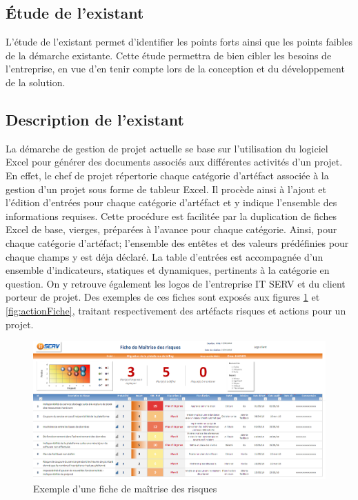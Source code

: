 \begin{spacing}{1.5}
\section{Étude de l'existant}
L'étude de l'existant permet d'identifier les points forts ainsi que les points faibles de la démarche existante. Cette étude permettra de bien cibler les besoins de l'entreprise, en vue d'en tenir compte lors de la conception et du développement de la solution.
\subsection{Description de l'existant}
La démarche de gestion de projet actuelle se base sur l'utilisation du logiciel Excel pour générer des documents associés aux différentes activités d'un projet. En effet, le chef de projet répertorie chaque catégorie d'artéfact associée à la gestion d'un projet sous forme de tableur Excel. Il procède ainsi à l'ajout et l'édition d'entrées pour chaque catégorie d'artéfact et y indique l'ensemble des informations requises. Cette procédure est facilitée par la duplication de fiches Excel de base, vierges, préparées à l'avance pour chaque catégorie. Ainsi, pour chaque catégorie d'artéfact; l'ensemble des entêtes et des valeurs prédéfinies pour chaque champs y est déja déclaré. La table d'entrées est accompagnée d'un ensemble d'indicateurs, statiques et dynamiques, pertinents à la catégorie en question. On y retrouve également les logos de l'entreprise IT SERV et du client porteur de projet. Des exemples de ces fiches sont exposés aux figures \ref{fig:risqueFiche} et \ref{fig:actionFiche}, traitant respectivement des artéfacts risques et actions pour un projet.

\begin{figure}[H]
\centering
\includegraphics[width=\linewidth]{ficheRisques.png}
\caption{Exemple d'une fiche de maîtrise des risques}
\label{fig:risqueFiche}
\end{figure}


\end{spacing}
